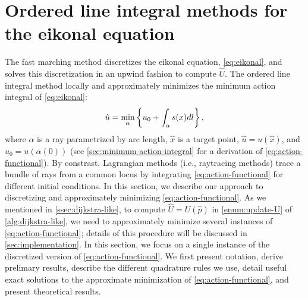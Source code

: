 \documentclass[sisc-eikonal.tex]{subfiles}
\begin{document}
\section{Ordered line integral methods for the eikonal equation}

The fast marching method discretizes the eikonal equation,
\cref{eq:eikonal}, and solves this discretization in an upwind fashion
to compute $\hat{U}$. The ordered line integral method locally and
approximately minimizes the minimum action integral of
\cref{eq:eikonal}:
\begin{equation}
  \label{eq:action-functional}
  \hat{u} = \min_{\alpha} \set{u_0 + \int_\alpha s(x) dl},
\end{equation}
where $\alpha$ is a ray parametrized by arc length, $\hat{x}$ is a
target point, $\hat{u} = u(\hat{x})$, and $u_0 = u(\alpha(0))$ (see
\cref{sec:minimum-action-integral} for a derivation of
\cref{eq:action-functional}). By constrast, Lagrangian methods (i.e.,
raytracing methods) trace a bundle of rays from a common locus by
integrating \cref{eq:action-functional} for different initial
conditions. In this section, we describe our approach to discretizing
and approximately minimizing \cref{eq:action-functional}. As we
mentioned in \cref{ssec:dijkstra-like}, to compute
$\hat{U} = U(\hat{p})$ in \cref{enum:update-U} of
\cref{alg:dijkstra-like}, we need to approximately minimize several
instances of \cref{eq:action-functional}; details of this procedure
will be discussed in \cref{sec:implementation}. In this section, we
focus on a single instance of the discretized version of
\cref{eq:action-functional}. We first present notation, derive
prelimary results, describe the different quadrature rules we use,
detail useful exact solutions to the approximate minimization of
\cref{eq:action-functional}, and present theoretical results.
\end{document}
